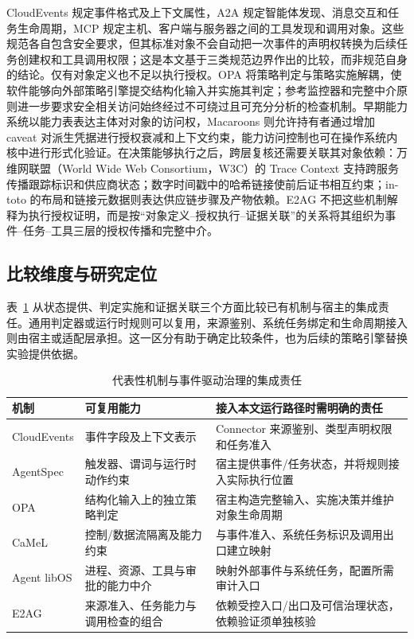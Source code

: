 CloudEvents 规定事件格式及上下文属性，A2A 规定智能体发现、消息交互和任务生命周期，MCP 规定主机、客户端与服务器之间的工具发现和调用对象\cite{cloudevents,a2a,mcp}。这些规范各自包含安全要求，但其标准对象不会自动把一次事件的声明权转换为后续任务创建权和工具调用权限；这是本文基于三类规范边界作出的比较，而非规范自身的结论。仅有对象定义也不足以执行授权。OPA 将策略判定与策略实施解耦，使软件能够向外部策略引擎提交结构化输入并实施其判定\cite{opa}；参考监控器和完整中介原则进一步要求安全相关访问始终经过不可绕过且可充分分析的检查机制\cite{reference-monitor,saltzer-schroeder}。早期能力系统以能力表表达主体对对象的访问权，Macaroons 则允许持有者通过增加 caveat 对派生凭据进行授权衰减和上下文约束，能力访问控制也可在操作系统内核中进行形式化验证\cite{dennis-capability,macaroons,cap-os}。在决策能够执行之后，跨层复核还需要关联其对象依赖：万维网联盟（World Wide Web Consortium，W3C）的 Trace Context 支持跨服务传播跟踪标识和供应商状态；数字时间戳中的哈希链接使前后证书相互约束；in-toto 的布局和链接元数据则表达供应链步骤及产物依赖\cite{trace-context,haber-stornetta,in-toto}。E2AG 不把这些机制解释为执行授权证明，而是按“对象定义--授权执行--证据关联”的关系将其组织为事件--任务--工具三层的授权传播和完整中介。

\subsection{比较维度与研究定位}

表~\ref{tab:related-scope-v11} 从状态提供、判定实施和证据关联三个方面比较已有机制与宿主的集成责任。通用判定器或运行时规则可以复用，来源鉴别、系统任务绑定和生命周期接入则由宿主或适配层承担。这一区分有助于确定比较条件，也为后续的策略引擎替换实验提供依据。

\begin{table}[htbp]
\centering
\caption{代表性机制与事件驱动治理的集成责任}
\label{tab:related-scope-v11}
\small
\begin{tabular}{p{23mm}p{49mm}p{65mm}}
\toprule
机制 & 可复用能力 & 接入本文运行路径时需明确的责任 \\
\midrule
CloudEvents & 事件字段及上下文表示 & Connector 来源鉴别、类型声明权限和任务准入 \\
AgentSpec & 触发器、谓词与运行时动作约束 & 宿主提供事件/任务状态，并将规则接入实际执行位置 \\
OPA & 结构化输入上的独立策略判定 & 宿主构造完整输入、实施决策并维护对象生命周期 \\
CaMeL & 控制/数据流隔离及能力约束 & 与事件准入、系统任务标识及调用出口建立映射 \\
Agent libOS & 进程、资源、工具与审批的能力中介 & 映射外部事件与系统任务，配置所需审计入口 \\
E2AG & 来源准入、任务能力与调用检查的组合 & 依赖受控入口/出口及可信治理状态，依赖验证须单独核验 \\
\bottomrule
\end{tabular}
\end{table}

